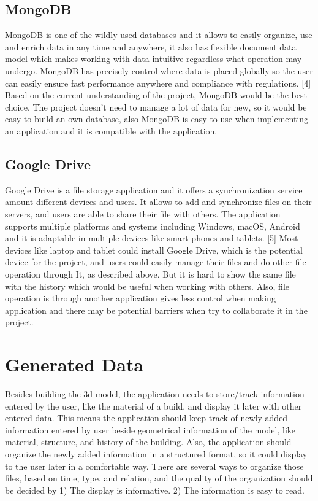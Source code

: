 \documentclass[10pt,letter paper]{article}
\begin{document}
\subsection{MongoDB}
MongoDB is one of the wildly used databases and it allows to easily organize, use and enrich data in any time and anywhere, it also has flexible document data model which makes working with data intuitive regardless what operation may undergo. MongoDB has precisely control where data is placed globally so the user can easily ensure fast performance anywhere and compliance with regulations. [4]\newline
\noindent
\newline
Based on the current understanding of the project, MongoDB would be the best choice. The project doesn’t need to manage a lot of data for new, so it would be easy to build an own database, also MongoDB is easy to use when implementing an application and it is compatible with the application.

\subsection{Google Drive}
Google Drive is a file storage application and it offers a synchronization service amount different devices and users. It allows to add and synchronize files on their servers, and users are able to share their file with others. The application supports multiple platforms and systems including Windows, macOS, Android and it is adaptable in multiple devices like smart phones and tablets. [5]\newline
\noindent
\newline
Most devices like laptop and tablet could install Google Drive, which is the potential device for the project, and users could easily manage their files and do other file operation through It, as described above. But it is hard to show the same file with the history which would be useful when working with others. Also, file operation is through another application gives less control when making application and there may be potential barriers when try to collaborate it in the project.

\section{Generated Data}
Besides building the 3d model, the application needs to store/track information entered by the user, like the material of a build,  and display it later with other entered data. This means the application should keep track of newly added information entered by user beside geometrical information of the model, like material, structure, and history of the building. Also, the application should organize the newly added information in a structured format, so it could display to the user later in a comfortable way. There are several ways to organize those files, based on time, type, and relation, and the quality of the organization should be decided by 1) The display is informative. 2) The information is easy to read.
\end{document}
